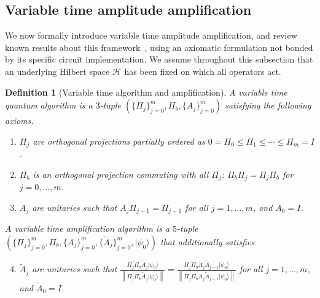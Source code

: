 \documentclass[letterpaper,onecolumn,11pt,accepted=2026-02-14]{quantumarticle}
\newcommand{\norm}[1]{\left\lVert#1\right\rVert}
\newtheorem{definition}[lemma]{Definition}
\theoremstyle{remark}
\theoremstyle{plain}
\newcommand{\ket}[1]{|#1\rangle}
\begin{document}
\subsection{Variable time amplitude amplification}
\label{sec:prelim_amp}
We now formally introduce variable time amplitude amplification, and review known results about this framework~\cite{Ambainis2012VTAA,Chakraborty2018BlockEncoding}, using an axiomatic formulation not bonded by its specific circuit implementation. We assume throughout this subsection that an underlying Hilbert space $\mathcal{H}$ has been fixed on which all operators act.

\begin{definition}[Variable time algorithm and amplification]
\label{defn:vta}
A variable time quantum algorithm is a $3$-tuple $\left(\{\Pi_j\}_{j=0}^m,\Pi_b,\{A_j\}_{j=0}^m\right)$ satisfying the following axioms.
\begin{enumerate}[label=(\roman*)]
    \item \label{enum:vta_clock} $\Pi_j$ are orthogonal projections partially ordered as $0=\Pi_0\leq\Pi_1\leq\cdots\leq\Pi_m=I$.
    \item \label{enum:vta_flag} $\Pi_b$ is an orthogonal projection  commuting with all $\Pi_j$: $\Pi_b\Pi_j=\Pi_j\Pi_b$ for $j=0,\ldots, m$.
    \item \label{enum:vta_input} $A_j$ are unitaries such that $A_j\Pi_{j-1}=\Pi_{j-1}$ for all $j=1,\ldots, m$, and $A_0=I$.

\end{enumerate}
A variable time amplification algorithm is a $5$-tuple $\left(\{\Pi_j\}_{j=0}^m,\Pi_b,\{A_j\}_{j=0}^m,\{\widetilde{A}_j\}_{j=0}^m,\ket{\psi_0}\right)$
that additionally satisfies
\begin{enumerate}[label=(\roman*)]
\setcounter{enumi}{3}
    \item \label{enum:vta_amp} $\widetilde A_j$ are unitaries such that $\frac{\overline{\Pi_j\Pi_b}\widetilde{A}_j\ket{\psi_0}}{\norm{\overline{\Pi_j\Pi_b}\widetilde{A}_j\ket{\psi_0}}}
    =\frac{\overline{\Pi_j\Pi_b}A_j\widetilde{A}_{j-1}\ket{\psi_0}}{\norm{\overline{\Pi_j\Pi_b}A_j\widetilde{A}_{j-1}\ket{\psi_0}}}$ for all $j=1,\ldots, m$, and $\widetilde A_0=I$.
\end{enumerate}
\end{definition}
\end{document}
